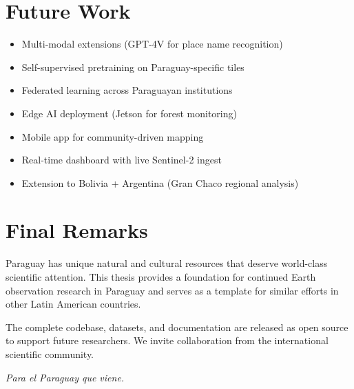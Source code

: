 \section{Future Work}

\begin{itemize}
    \item Multi-modal extensions (GPT-4V for place name recognition)
    \item Self-supervised pretraining on Paraguay-specific tiles
    \item Federated learning across Paraguayan institutions
    \item Edge AI deployment (Jetson for forest monitoring)
    \item Mobile app for community-driven mapping
    \item Real-time dashboard with live Sentinel-2 ingest
    \item Extension to Bolivia + Argentina (Gran Chaco regional analysis)
\end{itemize}

\section{Final Remarks}

Paraguay has unique natural and cultural resources that deserve world-class
scientific attention. This thesis provides a foundation for continued
Earth observation research in Paraguay and serves as a template for similar
efforts in other Latin American countries.

The complete codebase, datasets, and documentation are released as open
source to support future researchers. We invite collaboration from the
international scientific community.

\vspace{2cm}
\begin{center}
\textit{Para el Paraguay que viene.}
\end{center}
